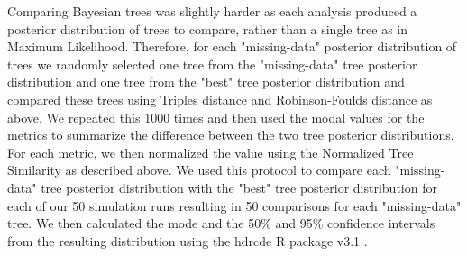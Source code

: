 \documentclass[12pt,letterpaper]{article}
\begin{document}


Comparing Bayesian trees was slightly harder as each analysis produced a posterior distribution of trees to compare, rather than a single tree as in Maximum Likelihood.
Therefore, for each "missing-data" posterior distribution of trees we randomly selected one tree from the "missing-data" tree posterior distribution and one tree from the "best" tree posterior distribution and compared these trees using Triples distance and Robinson-Foulds distance as above.
We repeated this 1000 times and then used the modal values for the metrics to summarize the difference between the two tree posterior distributions.
For each metric, we then normalized the value using the Normalized Tree Similarity as described above.
We used this protocol to compare each "missing-data" tree posterior distribution with the "best" tree posterior distribution for each of our 50 simulation runs resulting in 50 comparisons for each "missing-data" tree.
We then calculated the mode and the 50\% and 95\% confidence intervals from the resulting distribution using the hdrcde R package v3.1 \citep{hdrcde}. %
\end{document}
